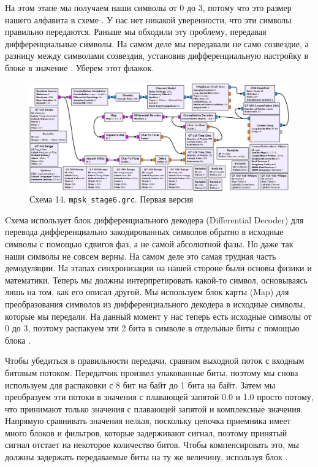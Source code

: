 \documentclass[a4paper, 12pt]{report}
\begin{document}
	На этом этапе мы получаем наши символы от 0 до 3, потому что это размер нашего алфавита в схеме . У нас нет никакой уверенности, что эти символы правильно передаются. Раньше мы обходили эту проблему, передавая дифференциальные символы. На самом деле мы передавали не само созвездие, а разницу между символами созвездия, установив дифференциальную настройку в блоке  в значение . Уберем этот флажок.
	\begin{figure}[H]
		\centering
		\includegraphics[width=1.0\textwidth]{39.jpg}
		\caption{Схема 14. \texttt{mpsk\_stage6.grc}. Первая версия}
		\label{fig:39}
	\end{figure}
	Cхема использует блок дифференциального декодера (Differential Decoder) для перевода дифференциально закодированных символов обратно в исходные символы с помощью сдвигов фаз, а не самой абсолютной фазы. Но даже так наши символы не совсем верны. На самом деле это самая трудная часть демодуляции. На этапах синхронизации на нашей стороне были основы физики и математики. Теперь мы должны интерпретировать какой-то символ, основываясь лишь на том, как его описал другой.  Мы используем блок карты (Map) для преобразования символов из дифференциального декодера в исходные символы, которые мы передали. На данный момент у нас теперь есть исходные символы от 0 до 3, поэтому распакуем эти 2 бита в символе в отдельные биты с помощью блока .

	Чтобы убедиться в правильности передачи, сравним выходной поток с входным битовым потоком. Передатчик произвел упакованные биты, поэтому мы снова используем  для распаковки с 8 бит на байт до 1 бита на байт. Затем мы преобразуем эти потоки в значения с плавающей запятой 0.0 и 1.0 просто потому, что  принимают только значения с плавающей запятой и комплексные значения. Напрямую сравнивать значения нельзя, поскольку цепочка приемника имеет много блоков и фильтров, которые задерживают сигнал, поэтому принятый сигнал отстает на некоторое количество битов. Чтобы компенсировать это, мы должны задержать передаваемые биты на ту же величину, используя блок . 
	
\end{document}
